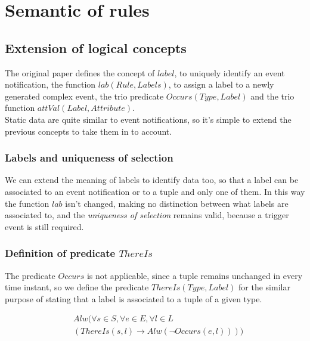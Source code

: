 
\section{Semantic of rules}

\subsection{Extension of logical concepts}
The original paper defines the concept of $label$, to uniquely identify an event notification, the function $lab(Rule, Labels)$, to assign a label to a newly generated complex event, the trio predicate $Occurs(Type, Label)$ and the trio function $attVal(Label, Attribute)$.\\
Static data are quite similar to event notifications, so it's simple to extend the previous concepts to take them in to account.

\subsubsection{Labels and uniqueness of selection}
We can extend the meaning of labels to identify data too, so that a label can be associated to an event notification or to a tuple and only one of them. In this way the function $lab$ isn't changed, making no distinction between what labels are associated to, and the \emph{uniqueness of selection} remains valid, because a trigger event is still required.

\subsubsection{Definition of predicate $ThereIs$}
The predicate $Occurs$ is not applicable, since a tuple remains unchanged in every time instant, so we define the predicate $ThereIs(Type, Label)$ for the similar purpose of stating that a label is associated to a tuple of a given type.

\begin{align*}
  &Alw(\forall s \in S, \forall e \in E, \forall l \in L\\
  &(ThereIs(s, l) \rightarrow Alw(\neg Occurs(e, l))))
\end{align*}

